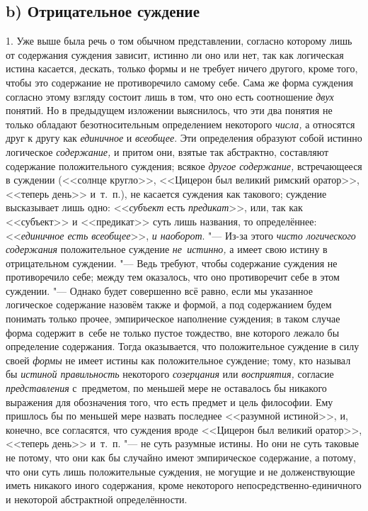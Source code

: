 \subsection[b) Отрицательное суждение]{b) Отрицательное суждение}

1. Уже выше была речь о том обычном представлении, согласно
которому лишь от содержания суждения зависит, истинно ли оно или нет, так
как логическая истина касается, дескать, только формы и не требует ничего
другого, кроме того, чтобы это содержание не противоречило самому себе.
Сама же форма суждения согласно этому взгляду состоит лишь в том, что оно
есть соотношение {\em двух} понятий. Но в предыдущем изложении выяснилось, что
эти два понятия не только обладают безотносительным определением некоторого
{\em числа,} а относятся друг к другу как {\em единичное} и {\em всеобщее}.
Эти определения образуют собой истинно логическое {\em содержание,} и притом
они, взятые так абстрактно, составляют содержание положительного суждения;
всякое {\em другое содержание,} встречающееся в суждении (<<солнце кругло>>,
<<Цицерон был великий римский оратор>>, <<теперь день>> и~т.~п.), не касается
суждения как такового; суждение высказывает лишь одно: <<{\em субъект} есть
{\em предикат}>>, или, так как <<субъект>> и <<предикат>> суть лишь названия,
то определённее: <<{\em единичное есть всеобщее}>>, {\em и наоборот}. "---
Из-за этого {\em чисто логического содержания} положительное суждение
{\em не~истинно,} а имеет свою истину в отрицательном суждении. "--- Ведь
требуют, чтобы содержание суждения не противоречило себе; между тем оказалось,
что оно противоречит себе в этом суждении. "--- Однако будет совершенно
всё равно, если мы указанное логическое содержание назовём также и формой,
а под содержанием будем понимать только прочее, эмпирическое наполнение
суждения; в таком случае форма содержит в~себе не только пустое тождество,
вне которого лежало бы определение содержания. Тогда оказывается, что
положительное суждение в силу своей {\em формы} не имеет
истины как положительное суждение; тому, кто называл бы
{\em истиной правильность} некоторого {\em созерцания} или
{\em восприятия,} согласие {\em представления} с~предметом,
по меньшей мере не оставалось бы никакого выражения для
обозначения того, что есть предмет и цель философии. Ему пришлось бы по
меньшей мере назвать последнее <<разумной истиной>>, и, конечно, все
согласятся, что суждения вроде <<Цицерон был великий оратор>>, <<теперь день>>
и~т.~п. "--- не суть разумные истины. Но они не суть таковые не
потому, что они как бы случайно имеют эмпирическое содержание, а потому,
что они суть лишь положительные суждения, не могущие и не долженствующие
иметь никакого иного содержания, кроме некоторого
непосредственно-единичного и некоторой абстрактной определённости.

